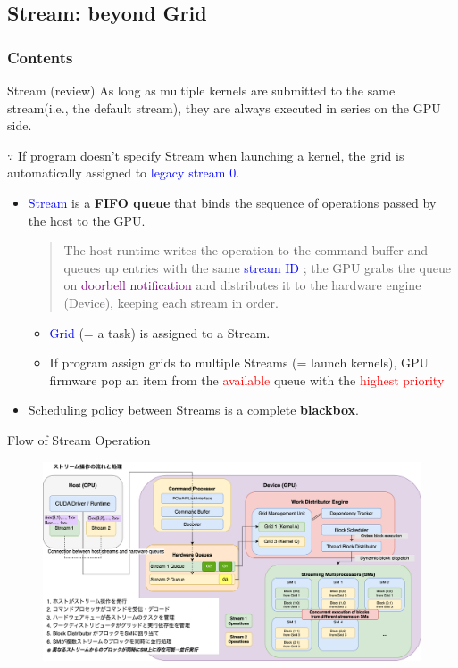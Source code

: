 \documentclass[dvipdfmx, 11pt, aspectratio=169]{beamer}   %
\begin{document}
\subsection{Stream: beyond Grid} %
\begin{frame}
    \frametitle{Contents}
    \linespread{0.6}\selectfont
\end{frame}
\begin{frame}{Stream}
  (review) As long as multiple kernels are submitted to the same stream(i.e., the default stream), 
  they are always executed in series on the GPU side.

  $\because$ If program doesn't specify Stream when launching a kernel, the grid is automatically assigned to \textcolor{blue}{legacy stream 0}.
  \begin{itemize}
    \item \textcolor{blue}{Stream} is a \textbf{FIFO queue} that binds the sequence of operations passed by the host to the GPU.
  \begin{quote}
    \vspace{0.2\baselineskip}
    \small
    The host runtime writes the operation to the command buffer and queues up entries with the same \textcolor{blue}{stream ID}
    ; the GPU grabs the queue on \textcolor{purple}{doorbell notification} and distributes it to the hardware engine (Device), keeping each stream in order.
  \end{quote}\vspace{-\baselineskip}
  \begin{itemize}
    \item \textcolor{blue}{Grid} (= a task) is assigned to a Stream.
    \item If program assign grids to multiple Streams (= launch kernels), GPU firmware pop an item from the \textcolor{red}{available} queue with the \textcolor{red}{highest priority}
  \end{itemize}
    \item Scheduling policy between Streams is a complete \textbf{blackbox}.
  \end{itemize}
\end{frame}
\begin{frame}{Flow of Stream Operation}
  \begin{figure}
    \includegraphics[scale=0.08]{img/grid-advanced_ver2.png}
  \end{figure}
\end{frame}
\end{document}
